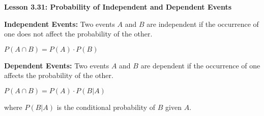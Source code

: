 \begin{center}
\textbf{Lesson 3.31: Probability of Independent and Dependent Events}
\end{center}

\vspace*{-1.5ex}

\noindent\textbf{Independent Events:} Two events \( A \) and \( B \) are independent if the occurrence of one does not affect the probability of the other.

{\centering $     P(A \cap B) = P(A) \cdot P(B) $\par}

\noindent \textbf{Dependent Events:} Two events \( A \) and \( B \) are dependent if the occurrence of one affects the probability of the other.

{\centering $     P(A \cap B) = P(A) \cdot P(B|A) $\par}

\noindent     where \( P(B|A) \) is the conditional probability of \( B \) given \( A \).

